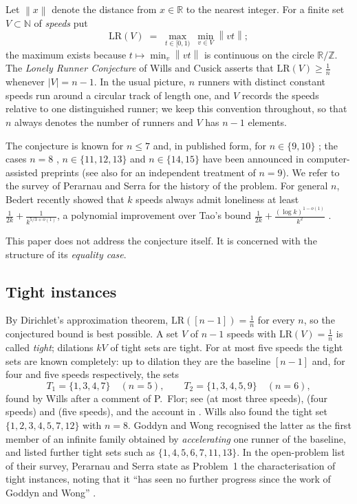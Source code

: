 \documentclass[11pt]{article}
\theoremstyle{definition}
\newcommand{\LR}{\mathrm{LR}}
\newcommand{\Z}{\mathbb{Z}}
\newcommand{\N}{\mathbb{N}}
\newcommand{\norm}[1]{\left\lVert #1 \right\rVert}
\begin{document}
Let $\norm{x}$ denote the distance from $x\in\mathbb R$ to the nearest
integer. For a finite set $V\subset\N$ of \emph{speeds} put
\[
\LR(V)\;=\;\max_{t\in[0,1)}\ \min_{v\in V}\norm{vt};
\]
the maximum exists because $t\mapsto\min_{v}\norm{vt}$ is continuous on
the circle $\mathbb R/\Z$. The \emph{Lonely Runner Conjecture} of Wills
\cite{Wills1967} and Cusick \cite{Cusick1973} asserts that
$\LR(V)\ge\frac1n$ whenever $\lvert V\rvert=n-1$. In the usual picture,
$n$ runners with distinct constant speeds run around a circular track of
length one, and $V$ records the speeds relative to one distinguished
runner; we keep this convention throughout, so that $n$ always denotes
the number of runners and $V$ has $n-1$ elements.

The conjecture is known for $n\le7$
\cite{BetkeWills1972,CusickPomerance1984,BieniaEtAl1998,BohmanHolzmanKleitman2001,BarajasSerra2008}
and, in published form, for $n\in\{9,10\}$ \cite{Trakulthongchai2026};
the cases $n=8$ \cite{Rosenfeld2025eight}, $n\in\{11,12,13\}$
\cite{SungkawichaiTrakulthongchai2026} and $n\in\{14,15\}$
\cite{Allikvere2026} have been announced in computer-assisted preprints
(see also \cite{Rosenfeld2025nine} for an independent treatment of
$n=9$). We refer to the survey of Perarnau and Serra
\cite{PerarnauSerra2025} for the history of the problem. For general
$n$, Bedert \cite{Bedert2025} recently showed that $k$ speeds always
admit loneliness at least $\frac1{2k}+\frac1{k^{5/3+o(1)}}$, a
polynomial improvement over Tao's bound
$\frac1{2k}+\frac{(\log k)^{1-o(1)}}{k^2}$ \cite{Tao2018}.

This paper does not address the conjecture itself. It is concerned with
the structure of its \emph{equality case}.

\subsection{Tight instances}

By Dirichlet's approximation theorem, $\LR([n-1])=\frac1n$ for every
$n$, so the conjectured bound is best possible. A set $V$ of $n-1$
speeds with $\LR(V)=\frac1n$ is called \emph{tight}; dilations $kV$ of
tight sets are tight. For at most five speeds the tight sets are known
completely: up to dilation they are the baseline $[n-1]$ and, for four
and five speeds respectively, the sets
\[
T_1=\{1,3,4,7\}\quad(n=5),\qquad T_2=\{1,3,4,5,9\}\quad(n=6),
\]
found by Wills \cite{Wills1968} after a comment of P.~Flor; see
\cite{Cusick1973,Cusick1974} (at most three speeds), \cite{Chen1991}
(four speeds) and \cite[Thm.~3]{BohmanHolzmanKleitman2001} (five
speeds), and the account in \cite[\S4]{PerarnauSerra2025}. Wills also
found the tight set
$\{1,2,3,4,5,7,12\}$ with $n=8$. Goddyn and Wong \cite{GoddynWong2006}
recognised the latter as the first member of an infinite family
obtained by \emph{accelerating} one runner of the baseline, and listed
further tight sets such as $\{1,4,5,6,7,11,13\}$. In the open-problem
list of their survey, Perarnau and Serra state as Problem~1 the
characterisation of tight instances, noting that it ``has seen no
further progress since the work of Goddyn and Wong''
\cite[\S 11, Problem~1]{PerarnauSerra2025}.
\end{document}
